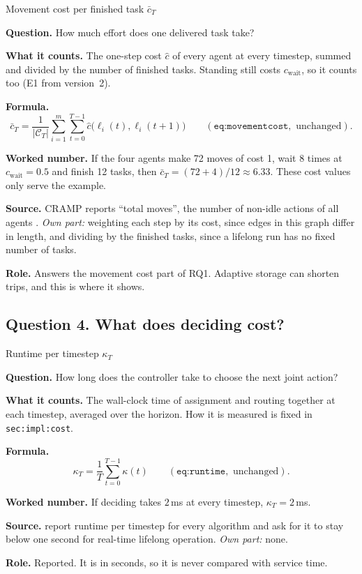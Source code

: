 \documentclass[11pt,a4paper]{article}
\newcommand{\row}[1]{\par\smallskip\noindent\textbf{#1}\enspace}
\begin{document}
\begin{card}{Movement cost per finished task $\bar c_T$}
\row{Question.} How much effort does one delivered task take?

\row{What it counts.} The one-step cost $\hat c$ of every agent at every
timestep, summed and divided by the number of finished tasks. Standing
still costs $c_{\mathrm{wait}}$, so it counts too (E1 from version~2).

\row{Formula.}
\[
  \bar c_T = \frac{1}{|\mathcal{C}_T|}\sum_{i=1}^{m}\sum_{t=0}^{T-1}
             \hat c\bigl(\ell_i(t),\ell_i(t+1)\bigr)
  \qquad (\texttt{eq:movementcost}, \text{ unchanged}).
\]

\row{Worked number.} If the four agents make 72 moves of cost 1, wait 8
times at $c_{\mathrm{wait}} = 0.5$ and finish 12 tasks, then
$\bar c_T = (72 + 4)/12 \approx 6.33$. These cost values only serve the
example.

\row{Source.} CRAMP reports ``total moves'', the number of non-idle
actions of all agents \citep{pham2024optimizingcrowdawaremultiagentpath}.
\emph{Own part:} weighting each step by its cost, since edges in this
graph differ in length, and dividing by the finished tasks, since a
lifelong run has no fixed number of tasks.

\row{Role.} Answers the movement cost part of RQ1. Adaptive storage can
shorten trips, and this is where it shows.
\end{card}

\subsection{Question 4. What does deciding cost?}

\begin{card}{Runtime per timestep $\kappa_T$}
\row{Question.} How long does the controller take to choose the next joint
action?

\row{What it counts.} The wall-clock time of assignment and routing
together at each timestep, averaged over the horizon. How it is measured
is fixed in \texttt{sec:impl:cost}.

\row{Formula.}
\[
  \kappa_T = \frac{1}{T}\sum_{t=0}^{T-1}\kappa(t)
  \qquad (\texttt{eq:runtime}, \text{ unchanged}).
\]

\row{Worked number.} If deciding takes $2$\,ms at every timestep,
$\kappa_T = 2$\,ms.

\row{Source.} \citet{ma2017lifelong_mapf} report runtime per timestep for
every algorithm and ask for it to stay below one second for real-time
lifelong operation. \emph{Own part:} none.

\row{Role.} Reported. It is in seconds, so it is never compared with
service time.
\end{card}
\end{document}
